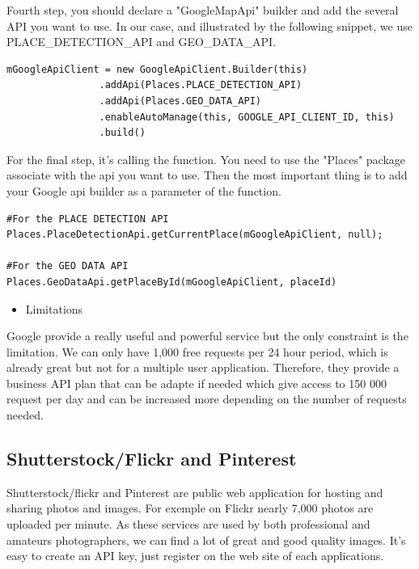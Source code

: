 Fourth step, you should declare a "GoogleMapApi" builder and add the several API you want to use. In our case, and illustrated by the following snippet, we use PLACE\_DETECTION\_API and GEO\_DATA\_API.

\begin{lstlisting}[language=XML, basicstyle=\scriptsize]
mGoogleApiClient = new GoogleApiClient.Builder(this)
                .addApi(Places.PLACE_DETECTION_API)
                .addApi(Places.GEO_DATA_API)
                .enableAutoManage(this, GOOGLE_API_CLIENT_ID, this)
                .build()
\end{lstlisting}

For the final step, it's calling the function. You need to use the "Places" package associate with the api you want to use. Then the most important thing is to add your Google api builder as a parameter of the function.
\begin{lstlisting}[language=XML, basicstyle=\scriptsize]
#For the PLACE DETECTION API
Places.PlaceDetectionApi.getCurrentPlace(mGoogleApiClient, null);

#For the GEO DATA API
Places.GeoDataApi.getPlaceById(mGoogleApiClient, placeId)
\end{lstlisting}

\begin{itemize}
    \item {Limitations}
\end{itemize}

Google provide a really useful and powerful service but the only constraint is the limitation. We can only have 1,000 free requests per 24 hour period, which is already great but not for a multiple user application.
Therefore, they provide a business API plan that can be adapte if needed which give access to 150 000 request per day and can be increased more depending on the number of requests needed.

\subsection{Shutterstock/Flickr and Pinterest}

Shutterstock/flickr and Pinterest are public web application for hosting and sharing photos and images. For exemple on Flickr nearly 7,000 photos are uploaded per minute.
As these services are used by both professional and amateurs photographers, we can find a lot of great and good quality images.
It's easy to create an API key, just register on the web site of each applications.


